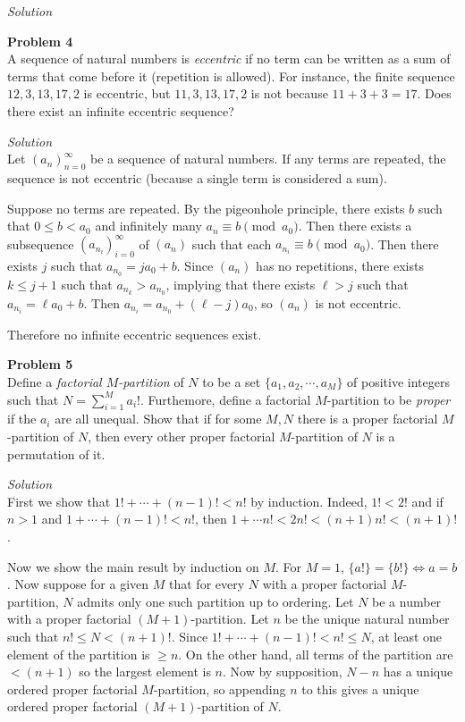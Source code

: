 \documentclass{amsart}
\begin{document}
\textit{Solution}\\

\pagebreak

\textbf{Problem 4}\\
A sequence of natural numbers is \textit{eccentric} if no term can be written as a sum of terms that come before it (repetition is allowed).
For instance, the finite sequence $12, 3, 13, 17, 2$ is eccentric, but $11, 3, 13, 17, 2$ is not because $11 + 3 + 3 = 17$.
Does there exist an infinite eccentric sequence?

\textit{Solution}\\
Let $(a_n)_{n = 0}^\infty$ be a sequence of natural numbers.
If any terms are repeated, the sequence is not eccentric (because a single term is considered a sum).

Suppose no terms are repeated.
By the pigeonhole principle, there exists $b$ such that $0 \leq b < a_0$ and infinitely many $a_n \equiv b \pmod{a_0}$.
Then there exists a subsequence $(a_{n_i})_{i = 0}^\infty$ of $(a_n)$ such that each $a_{n_i} \equiv b \pmod{a_0}$.
Then there exists $j$ such that $a_{n_0} = ja_0 + b$.
Since $(a_n)$ has no repetitions, there exists $k \leq j + 1$ such that $a_{n_k} > a_{n_0}$, implying that there exists $\ell > j$ such that $a_{n_i} = \ell a_0 + b$.
Then $a_{n_i} = a_{n_0} + (\ell - j) a_0$, so $(a_n)$ is not eccentric.

Therefore no infinite eccentric sequences exist.

\pagebreak

\textbf{Problem 5}\\
Define a \textit{factorial $M$-partition} of $N$ to be a set $\{a_1, a_2, \cdots, a_M\}$ of positive integers such that $\displaystyle N = \sum_{i = 1}^M a_i!$.
Furthemore, define a factorial $M$-partition to be \textit{proper} if the $a_i$ are all unequal.
Show that if for some $M, N$ there is a proper factorial $M$-partition of $N$, then every other proper factorial $M$-partition of $N$ is a permutation of it.

\textit{Solution}\\
First we show that $1! + \cdots + (n - 1)! < n!$ by induction.
Indeed, $1! < 2!$ and if $n > 1$ and $1 + \cdots + (n - 1)! < n!$, then $1 + \cdots n! < 2n! < (n + 1)n! < (n + 1)!$.

Now we show the main result by induction on $M$.
For $M = 1$, $\{a!\} = \{b!\} \iff a = b$.
Now suppose for a given $M$ that for every $N$ with a proper factorial $M$-partition, $N$ admits only one such partition up to ordering.
Let $N$ be a number with a proper factorial $(M + 1)$-partition.
Let $n$ be the unique natural number such that $n! \leq N < (n + 1)!$.
Since $1! + \cdots + (n - 1)! < n! \leq N$, at least one element of the partition is $\geq n$.
On the other hand, all terms of the partition are $<(n + 1)$ so the largest element is $n$.
Now by supposition, $N - n$ has a unique ordered proper factorial $M$-partition, so appending $n$ to this gives a unique ordered proper factorial $(M + 1)$-partition of $N$.
\end{document}
